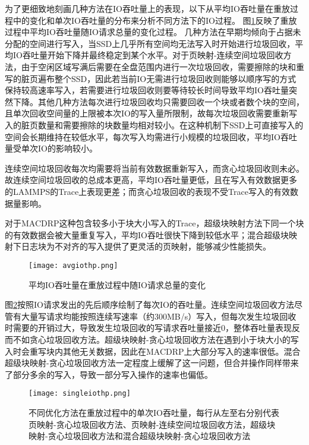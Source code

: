 为了更细致地刻画几种方法在IO吞吐量上的表现，以下从平均IO吞吐量在重放过程中的变化和单次IO吞吐量的分布来分析不同方法下的IO过程。
图\ref{fig:res_ioavg}反映了重放过程中平均IO吞吐量随IO请求总量的变化过程。
几种方法在早期均倾向于占据未分配的空间进行写入，当SSD上几乎所有空间均无法写入时开始进行垃圾回收，平均IO吞吐量开始下降并最终稳定到某个水平。对于页映射-连续空间垃圾回收方法，由于空闲区域写满后需要在全盘范围内进行一次垃圾回收，需要擦除的块和重写的脏页遍布整个SSD，因此若当前IO无需进行垃圾回收则能够以顺序写的方式保持较高速率写入，若需要进行垃圾回收则要等待较长时间导致平均IO吞吐量突然下降。其他几种方法每次进行垃圾回收均只需要回收一个块或者数个块的空间，且单次回收空间量的上限被本次IO的写入量所限制，故每次垃圾回收需要重新写入的脏页数量和需要擦除的块数量均相对较小。在这种机制下SSD上可直接写入的空间会长期维持在较低水平，每次写入均需进行小规模的垃圾回收，平均IO吞吐量受单次IO的影响较小。

连续空间垃圾回收每次均需要将当前有效数据重新写入，而贪心垃圾回收则未必。故连续空间垃圾回收的总成本更高，平均IO吞吐量更低，且在写入有效数据更多的LAMMPS的Trace上表现更差；而贪心垃圾回收的表现不受Trace写入的有效数据量影响。

对于MACDRP这种包含较多小于块大小写入的Trace，超级块映射方法下同一个块的有效数据会被大量重复写入，平均IO吞吐很快下降到较低水平；混合超级块映射下日志块为不对齐的写入提供了更灵活的页映射，能够减少性能损失。

\begin{figure}[H]
    \centering
    \texttt{[image: avgiothp.png]}
    \caption{平均IO吞吐量在重放过程中随IO请求总量的变化}
    \label{fig:res_ioavg}
\end{figure}

图\ref{fig:res_ioingle}按照IO请求发出的先后顺序绘制了每次IO的吞吐量。连续空间垃圾回收方法尽管有大量写请求均能按照连续写速率（约300MB/s）写入，但每次发生垃圾回收时需要的开销过大，导致发生垃圾回收的写请求吞吐量接近0，整体吞吐量表现反而不如贪心垃圾回收方法。超级块映射-贪心垃圾回收方法在遇到小于块大小的写入时会重写块内其他无关数据，因此在MACDRP上大部分写入的速率很低。混合超级块映射-贪心垃圾回收方法一定程度上缓解了这一问题，但合并操作同样带来了部分多余的写入，导致一部分写入操作的速率也偏低。

\begin{figure}[H]
    \centering
    \texttt{[image: singleiothp.png]}
    \caption[不同优化方法在重放过程中的单次IO吞吐量]{不同优化方法在重放过程中的单次IO吞吐量，每行从左至右分别代表页映射-贪心垃圾回收方法、页映射-连续空间垃圾回收方法，超级块映射-贪心垃圾回收方法和混合超级块映射-贪心垃圾回收方法}
    \label{fig:res_ioingle}
\end{figure}

